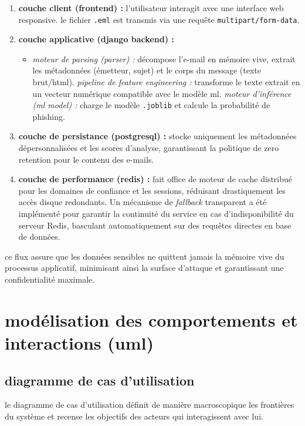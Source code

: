 \documentclass[12pt,a4paper]{report}
\begin{document}
\begin{enumerate}
    \item \textbf{couche client (frontend) :} l'utilisateur interagit avec une interface web responsive. le fichier \texttt{.eml} est transmis via une requête \texttt{multipart/form-data}.
    \item \textbf{couche applicative (django backend) :}
        \begin{itemize}
            \item \textit{moteur de parsing (parser) :} décompose l'e-mail en mémoire vive, extrait les métadonnées (émetteur, sujet) et le corps du message (texte brut/html).
            \textit{pipeline de feature engineering :} transforme le texte extrait en un vecteur numérique compatible avec le modèle ml.
            \textit{moteur d'inférence (ml model) :} charge le modèle \texttt{.joblib} et calcule la probabilité de phishing.
        \end{itemize}
    \item \textbf{couche de persistance (postgresql) :} stocke uniquement les métadonnées dépersonnalisées et les scores d'analyse, garantissant la politique de zero retention pour le contenu des e-mails.
    \item \textbf{couche de performance (redis) :} fait office de moteur de cache distribué pour les domaines de confiance et les sessions, réduisant drastiquement les accès disque redondants. Un mécanisme de \textit{fallback} transparent a été implémenté pour garantir la continuité du service en cas d'indisponibilité du serveur Redis, basculant automatiquement sur des requêtes directes en base de données.
\end{enumerate}

ce flux assure que les données sensibles ne quittent jamais la mémoire vive du processus applicatif, minimisant ainsi la surface d'attaque et garantissant une confidentialité maximale.

\section{modélisation des comportements et interactions (uml)}

\subsection{diagramme de cas d'utilisation}
le diagramme de cas d'utilisation définit de manière macroscopique les frontières du système et recense les objectifs des acteurs qui interagissent avec lui.
\end{document}

